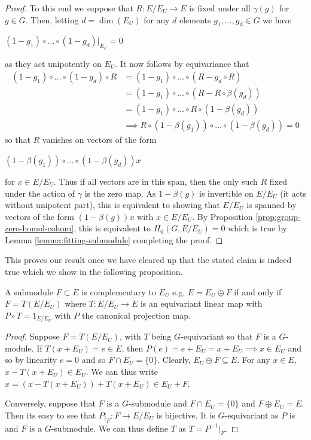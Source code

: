 \begin{proof}
    To this end we suppose that $R: E/E_U \to E$ is fixed under all $\gamma(g)$ for
    $g\in G$. Then, letting $d=\dim(E_U)$ for any $d$ elements $g_1, \dots, g_d \in
        G$ we have
    \begin{center}
        $(1-g_1)\circ \dots \circ (1-g_d)|_{E_U} = 0$
    \end{center}
    as they act unipotently on $E_U$. It now follows by equivariance that
    \begin{align*}
        (1-g_1)\circ \dots \circ (1-g_d) \circ R & = (1-g_1)\circ \dots \circ (R-g_d \circ R)                             \\
                                                 & = (1-g_1)\circ \dots \circ (R-R \circ \beta(g_d))                      \\
                                                 & = (1-g_1)\circ \dots \circ R \circ(1- \beta(g_d))                      \\
                                                 & \implies R \circ (1 - \beta(g_1))\circ \dots \circ (1- \beta(g_d)) = 0
    \end{align*}
    so that $R$ vanishes on vectors of the form
    \begin{center}
        $(1 - \beta(g_1))\circ \dots \circ (1- \beta(g_d))x$
    \end{center}
    for $x \in E/E_U$. Thus if all vectors are in this span, then the only such $R$ fixed under the action of $\gamma$ is the
    zero map. As $1 - \beta(g)$ is invertible on $E/E_U$ (it acts without unipotent part), this is equivalent to
    showing that $E/E_U$ is spanned by vectors of the form $(1 - \beta(g))x$ with $x \in E/E_U$. By Proposition \ref{prop:group-zero-homol-cohom}, this is equivalent to
    $H_0(G, E/E_U)= 0$ which is true by Lemma \ref{lemma:fitting-submodule} completing the proof.
\end{proof}

This proves our result once we have cleared up that the stated claim is indeed
true which we show in the following proposition.
\begin{prop}\label{prop:proofy}
    A submodule $F \subset E$ is complementary to $E_U$ e.g. $E = E_U \oplus F$ if and only if
    $F=T(E/E_U)$ where $T:E/E_U \to E$ is an equivariant linear map with $P \circ T = 1_{E/E_U}$ with $P$ the
    canonical projection map.
\end{prop}
\begin{proof}
    Suppose $F=T(E/E_U)$, with $T$ being $G$-equivariant so that $F$ is a
    $G$-module. If $T(x+E_U) = e \in E$, then $P(e) = e+E_U = x+E_U \implies x \in
        E_U$ and so by linearity $e = 0$ and so $F \cap E_U = \{0\}$. Clearly, $E_U
        \oplus F \subseteq E$. For any $x \in E$, $x-T(x+E_U) \in E_U$. We can thus
    write $x = (x-T(x+E_U)) + T(x+E_U) \in E_U + F$.

    Conversely, suppose that $F$ is a $G$-submodule and $F \cap E_U = \{0\}$ and $F
        \oplus E_U = E$. Then its easy to see that $P|_F : F \to E/E_U$ is bijective.
    It is $G$-equivariant as $P$ is and $F$ is a $G$-submodule. We can thus define
    $T$ as $T = P^{-1}|_F$.
\end{proof}

